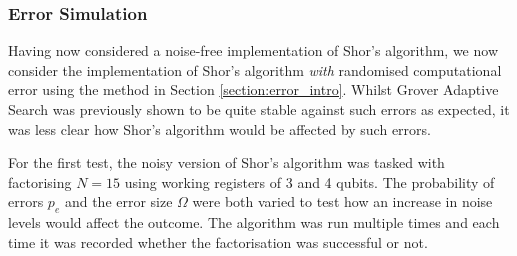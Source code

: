 \documentclass{article}[11pt]
\begin{document}
\subsubsection{Error Simulation}\label{section:errorshor}
Having now considered a noise-free implementation of Shor's algorithm, we now consider the implementation of Shor's algorithm \emph{with} randomised computational error using the method in Section \ref{section:error_intro}. Whilst Grover Adaptive Search was previously shown to be quite stable against such errors as expected, it was less clear how Shor's algorithm would be affected by such errors.

For the first test, the noisy version of Shor's algorithm was tasked with factorising $N=15$ using working registers of 3 and 4 qubits. The probability of errors $p_e$ and the error size $\Omega$ were both varied to test how an increase in noise levels would affect the outcome. The algorithm was run multiple times and each time it was recorded whether the factorisation was successful or not.
\end{document}

